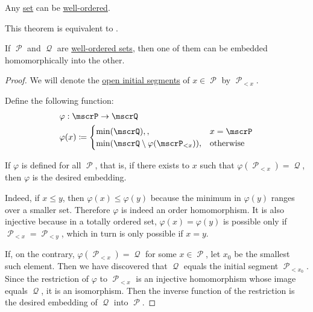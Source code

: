\begin{theorem}\label{thm:well_ordering_principle}
  Any \hyperref[def:set_zfc]{set} can be \hyperref[def:well_ordered_set]{well-ordered}.

  This theorem is equivalent to .
\end{theorem}

\begin{proposition}\label{thm:well_ordered_sets_can_be_embedded}
  If \( \mscrP \) and \( \mscrQ \) are \hyperref[def:well_ordered_set]{well-ordered sets}, then one of them can be embedded homomorphically into the other.
\end{proposition}
\begin{proof}
  We will denote the \hyperref[def:poset_interval/ray]{open initial segments} of \( x \in \mscrP \) by \( \mscrP_{<x} \).

  Define the following function:
  \begin{equation*}
    \begin{aligned}
      &\varphi: \mscrP \to \mscrQ \\
      &\varphi(x) \coloneqq \begin{cases}
        \min(\mscrQ),                               , &x = \mscrP \\
        \min(\mscrQ \setminus \varphi(\mscrP_{<x}) ), &\T{otherwise}
      \end{cases}
    \end{aligned}
  \end{equation*}

  If \( \varphi \) is defined for all \( \mscrP \), that is, if there exists to \( x \) such that \( \varphi(\mscrP_{<x}) = \mscrQ \), then \( \varphi \) is the desired embedding.

  Indeed, if \( x \leq y \), then \( \varphi(x) \leq \varphi(y) \) because the minimum in \( \varphi(y) \) ranges over a smaller set. Therefore \( \varphi \) is indeed an order homomorphism. It is also injective because in a totally ordered set, \( \varphi(x) = \varphi(y) \) is possible only if \( \mscrP_{<x} = \mscrP_{<y} \), which in turn is only possible if \( x = y \).

  If, on the contrary, \( \varphi(\mscrP_{<x}) = \mscrQ \) for some \( x \in \mscrP \), let \( x_0 \) be the smallest such element. Then we have discovered that \( \mscrQ \) equals the initial segment \( \mscrP_{<x_0} \). Since the restriction of \( \varphi \) to \( \mscrP_{<x} \) is an injective homomorphism whose image equals \( \mscrQ \), it is an isomorphism. Then the inverse function of the restriction is the desired embedding of \( \mscrQ \) into \( \mscrP \).
\end{proof}

